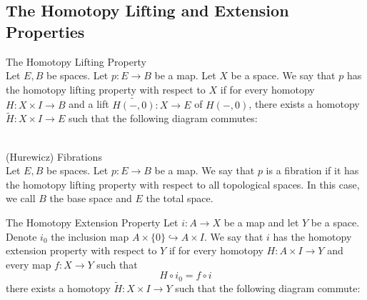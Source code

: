 \documentclass[a4paper]{article}
\begin{document}
\subsection{The Homotopy Lifting and Extension Properties}
\begin{defn}{The Homotopy Lifting Property}{}\\
Let $E,B$ be spaces. Let $p:E\to B$ be a map. Let $X$ be a space. We say that $p$ has the homotopy lifting property with respect to $X$ if for every homotopy $H:X\times I\to B$ and a lift $\widetilde{H(-,0)}:X\to E$ of $H(-,0)$, there exists a homotopy $\widetilde{H}:X\times I\to E$ such that the following diagram commutes: \\
\\
\end{defn}

\begin{defn}{(Hurewicz) Fibrations}{}\\
Let $E,B$ be spaces. Let $p:E\to B$ be a map. We say that $p$ is a fibration if it has the homotopy lifting property with respect to all topological spaces. In this case, we call $B$ the base space and $E$ the total space. 
\end{defn}

\begin{defn}{The Homotopy Extension Property}{} Let $i:A\to X$ be a map and let $Y$ be a space. Denote $i_0$ the inclusion map $A\times\{0\}\hookrightarrow A\times I$. We say that $i$ has the homotopy extension property with respect to $Y$ if for every homotopy $H:A\times I\to Y$ and every map $f:X\to Y$ such that $$H\circ i_0=f\circ i$$ there exists a homotopy $\widetilde{H}:X\times I\to Y$ such that the following diagram commute: \\
\\
\end{defn}
\end{document}

